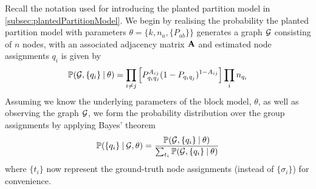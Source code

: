 Recall the notation used for introducing the planted partition model in \cref{subsec:plantedPartitionModel}.
We begin by realising the probability the planted partition model with parameters $\theta = \{k,n_{a},\{P_{ab}\}\}$ generates a graph $\mathcal G$ consisting of $n$ nodes, with an associated adjacency matrix $\mathbf A$ and estimated node assignments ${q_{i}}$ is given by
\begin{equation}
	\label{eq:probabilityPPMGeneratingGraph}
	\mathbb{P}(\mathcal G,\{q_{i}\} \:\lvert\: \theta) = \prod_{i \neq j} \left[ P_{q_{i}q_{j}}^{A_{ij}} (1-P_{q_{i}q_{j}})^{1-A_{ij}} \right] \prod_{i} n_{q_{i}}
\end{equation}
Assuming we know the underlying parameters of the block model, $\theta$, as well as observing the graph $\mathcal G$, we form the probability distribution over the group assignments by applying Bayes' theorem
\begin{equation}
	\label{eq:probabilityDistributionGroupAssignments}
	\mathbb{P}(\{q_{i}\} \:\lvert\: \mathcal G,\theta) = \frac{\mathbb{P}(\mathcal G,\{q_{i}\} \:\lvert\: \theta)}{\sum_{t_{i}} \mathbb{P}(\mathcal G,\{q_{i}\} \:\lvert\: \theta)}
\end{equation}
where $\{ t_{i} \}$ now represent the ground-truth node assignments (instead of $\{ \sigma_{i} \}$) for convenience.

